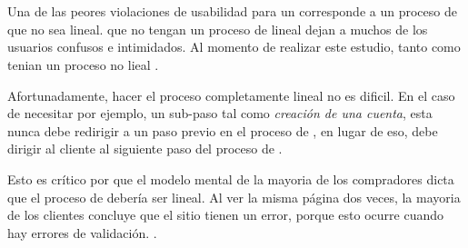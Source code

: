 \section{\checkoutEF}\label{chapter:solucionimplementada:section:checkout}

	Una de las peores violaciones de usabilidad para un \websiteINT \ecommerceCOM corresponde a un proceso de \checkoutEF que no sea lineal. \websiteINT que no tengan un proceso de \checkoutEF lineal dejan a muchos de los usuarios confusos e intimidados. Al momento de realizar este estudio, tanto \walmartNAME como \zapposNAME tenian un proceso \checkoutEF no lieal \cite{online_official_smashingmagazine_fundamental_guidelines_checkout_design}.


	Afortunadamente, hacer el proceso completamente lineal no es dificil. En el caso de necesitar por ejemplo, un sub-paso tal como \textit{creación de una cuenta}, esta nunca debe redirigir a un paso previo en el proceso de \checkoutEF, en lugar de eso, debe dirigir al cliente al siguiente paso del proceso de \checkoutEF\cite{online_official_smashingmagazine_fundamental_guidelines_checkout_design}. 

	Esto es crítico por que el modelo mental de la mayoria de los compradores dicta que el proceso de \checkoutEF debería ser lineal. Al ver la misma página dos veces, la mayoria de los clientes concluye que el sitio tienen un error, porque esto ocurre cuando hay errores de validación. \cite{online_official_smashingmagazine_fundamental_guidelines_checkout_design}. 

